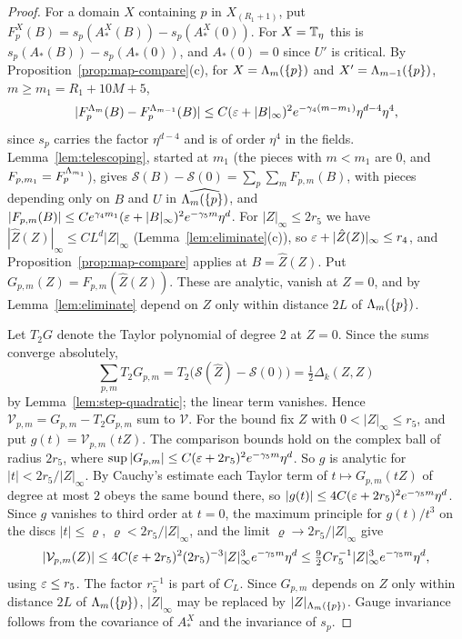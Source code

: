 \begin{proof}
For a domain $X$ containing $p$ in $X_{(R_1+1)}$, put $F^X_p(B)=s_p(A^X_*(B))-s_p(A^X_*(0))$. For $X=\mathbb T_\eta$ this is $s_p(A_*(B))-s_p(A_*(0))$, and $A_*(0)=0$ since $U'$ is critical. By Proposition~\ref{prop:map-compare}(c), for $X=\Lambda_m(\{p\})$ and $X'=\Lambda_{m-1}(\{p\})$, $m\ge m_1=R_1+10M+5$,
\[
|F^{\Lambda_m}_p(B)-F^{\Lambda_{m-1}}_p(B)|\le C(\varepsilon+|B|_\infty)^2e^{-\gamma_4(m-m_1)}\eta^{d-4}\eta^4 ,
\]
since $s_p$ carries the factor $\eta^{d-4}$ and is of order $\eta^4$ in the fields. Lemma~\ref{lem:telescoping}, started at $m_1$ (the pieces with $m<m_1$ are $0$, and $F_{p,m_1}=F^{\Lambda_{m_1}}_p$), gives $\mathcal S(B)-\mathcal S(0)=\sum_p\sum_mF_{p,m}(B)$, with pieces depending only on $B$ and $U$ in $\widehat{\Lambda_m(\{p\})}$, and $|F_{p,m}(B)|\le Ce^{\gamma_4m_1}(\varepsilon+|B|_\infty)^2e^{-\gamma_5m}\eta^d$. For $|Z|_\infty\le2r_5$ we have $|\hat Z(Z)|_\infty\le CL^d|Z|_\infty$ (Lemma~\ref{lem:eliminate}(c)), so $\varepsilon+|\hat Z(Z)|_\infty\le r_4$, and Proposition~\ref{prop:map-compare} applies at $B=\hat Z(Z)$. Put $G_{p,m}(Z)=F_{p,m}(\hat Z(Z))$. These are analytic, vanish at $Z=0$, and by Lemma~\ref{lem:eliminate} depend on $Z$ only within distance $2L$ of $\Lambda_m(\{p\})$.

Let $T_2G$ denote the Taylor polynomial of degree $2$ at $Z=0$. Since the sums converge absolutely,
\[
\sum_{p,m}T_2G_{p,m}=T_2\big(\mathcal S(\hat Z)-\mathcal S(0)\big)=\tfrac12\Delta_k(Z,Z)
\]
by Lemma~\ref{lem:step-quadratic}; the linear term vanishes. Hence $\mathcal V_{p,m}=G_{p,m}-T_2G_{p,m}$ sum to $\mathcal V$. For the bound fix $Z$ with $0<|Z|_\infty\le r_5$, and put $g(t)=\mathcal V_{p,m}(tZ)$. The comparison bounds hold on the complex ball of radius $2r_5$, where $\sup|G_{p,m}|\le C(\varepsilon+2r_5)^2e^{-\gamma_5m}\eta^d$. So $g$ is analytic for $|t|<2r_5/|Z|_\infty$. By Cauchy's estimate each Taylor term of $t\mapsto G_{p,m}(tZ)$ of degree at most $2$ obeys the same bound there, so $|g(t)|\le4C(\varepsilon+2r_5)^2e^{-\gamma_5m}\eta^d$. Since $g$ vanishes to third order at $t=0$, the maximum principle for $g(t)/t^3$ on the discs $|t|\le\varrho$, $\varrho<2r_5/|Z|_\infty$, and the limit $\varrho\to2r_5/|Z|_\infty$ give
\[
|\mathcal V_{p,m}(Z)|\le4C(\varepsilon+2r_5)^2(2r_5)^{-3}|Z|_\infty^3e^{-\gamma_5m}\eta^d\le\tfrac92Cr_5^{-1}|Z|_\infty^3e^{-\gamma_5m}\eta^d ,
\]
using $\varepsilon\le r_5$. The factor $r_5^{-1}$ is part of $C_L$. Since $G_{p,m}$ depends on $Z$ only within distance $2L$ of $\Lambda_m(\{p\})$, $|Z|_\infty$ may be replaced by $|Z|_{\Lambda_m(\{p\})}$. Gauge invariance follows from the covariance of $A^X_*$ and the invariance of $s_p$.
\end{proof}

